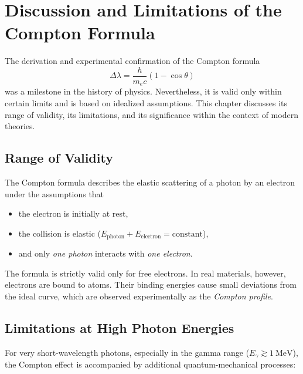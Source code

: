 \section{Discussion and Limitations of the Compton Formula}

The derivation and experimental confirmation of the Compton formula
\[
\Delta \lambda = \frac{h}{m_e c}(1 - \cos\theta)
\]
was a milestone in the history of physics. Nevertheless, it is valid only within certain limits
and is based on idealized assumptions. This chapter discusses its range of validity,
its limitations, and its significance within the context of modern theories.

\subsection{Range of Validity}

The Compton formula describes the elastic scattering of a photon by an electron under the assumptions that
\begin{itemize}
	\item the electron is initially at rest,
	\item the collision is elastic (\(E_\text{photon} + E_\text{electron} = \text{constant}\)),
	\item and only \emph{one photon} interacts with \emph{one electron}.
\end{itemize}

\begin{PhysicsBox}
	The formula is strictly valid only for free electrons.
	In real materials, however, electrons are bound to atoms.
	Their binding energies cause small deviations from the ideal curve,
	which are observed experimentally as the \emph{Compton profile}.
\end{PhysicsBox}

\subsection{Limitations at High Photon Energies}

For very short-wavelength photons, especially in the gamma range (\(E_\gamma \gtrsim 1~\text{MeV}\)),
the Compton effect is accompanied by additional quantum-mechanical processes:

